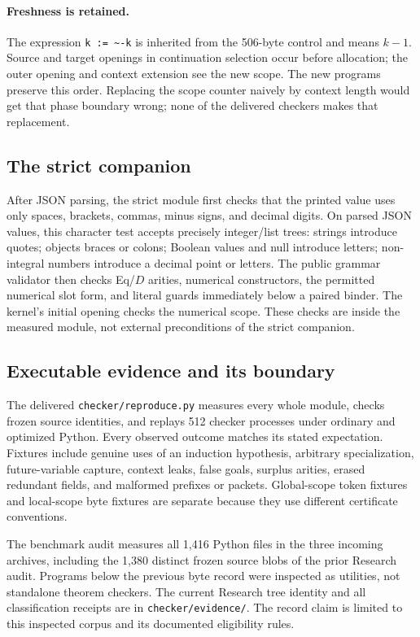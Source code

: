 \documentclass[11pt,letterpaper]{article}
\theoremstyle{definition}
\newcommand{\file}[1]{{\small\nolinkurl{#1}}}
\begin{document}
\paragraph{Freshness is retained.}
The expression \texttt{k := \~{}-k} is inherited from the 506-byte control
and means $k-1$. Source and target openings in continuation selection occur
before allocation; the outer opening and context extension see the new
scope. The new programs preserve this order. Replacing the scope counter
naively by context length would get that phase boundary wrong; none of the
delivered checkers makes that replacement.

\subsection{The strict companion}

After JSON parsing, the strict module first checks that the printed value
uses only spaces, brackets, commas, minus signs, and decimal digits.
On parsed JSON values, this character test accepts precisely integer/list
trees: strings introduce quotes; objects braces or colons; Boolean values
and null introduce letters; non-integral numbers introduce a decimal point
or letters. The public grammar validator then checks Eq/$D$ arities,
numerical constructors, the permitted numerical slot form, and literal
guards immediately below a paired binder. The kernel's initial opening
checks the numerical scope. These checks are inside the measured module,
not external preconditions of the strict companion.

\subsection{Executable evidence and its boundary}

The delivered \file{checker/reproduce.py} measures every whole module,
checks frozen source identities, and replays 512 checker processes under
ordinary and optimized Python. Every observed outcome matches its stated
expectation. Fixtures include genuine uses of an induction hypothesis,
arbitrary specialization, future-variable capture, context leaks,
false goals, surplus arities, erased redundant fields, and malformed
prefixes or packets. Global-scope token fixtures and local-scope byte
fixtures are separate because they use different certificate conventions.

The benchmark audit measures all 1,416 Python files in the three incoming
archives, including the 1,380 distinct frozen source blobs of the prior
Research audit. Programs below the previous byte record were inspected
as utilities, not standalone theorem checkers. The current Research tree
identity and all classification receipts are in
\file{checker/evidence/}. The record claim is limited to this inspected
corpus and its documented eligibility rules.
\end{document}
